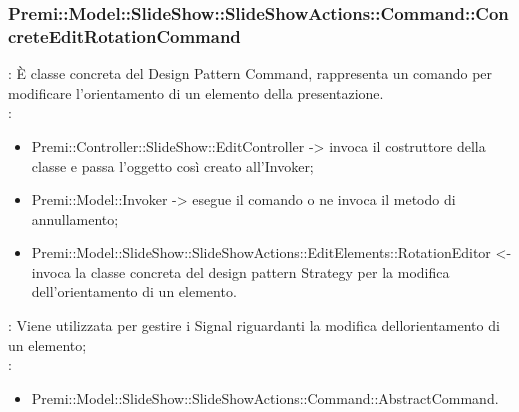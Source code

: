 {                     \subsubsection{Premi::Model::SlideShow::SlideShowActions::Command::ConcreteEditRotationCommand}{
				\textbf{\tipo}: È classe concreta del Design Pattern Command, rappresenta un comando per modificare l'orientamento di un elemento della presentazione.\\	
				\textbf{\relaz}: 
				\begin{itemize}
					\item Premi::Controller::SlideShow::EditController -> invoca il costruttore della classe e passa l’oggetto così creato all’Invoker;
                    \item Premi::Model::Invoker -> esegue il comando o ne invoca il metodo di annullamento;
                    \item Premi::Model::SlideShow::SlideShowActions::EditElements::RotationEditor <- invoca la classe concreta del design pattern Strategy per la modifica dell'orientamento di un elemento.
				\end{itemize}	
                \textbf{\interfacce}: Viene utilizzata per gestire i Signal riguardanti la modifica dellorientamento di un elemento;\\
                \textbf{\base}: 
                    \begin{itemize}
                    \item Premi::Model::SlideShow::SlideShowActions::Command::AbstractCommand.
                    \end{itemize}
                    }
}

